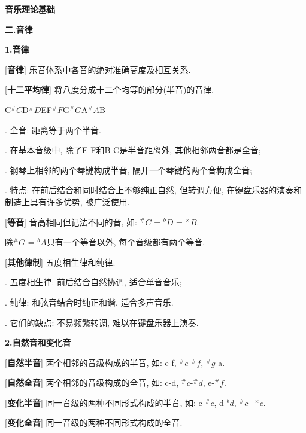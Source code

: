 

\begin{center} 
 \Large \textbf{音乐理论基础}\par
 \textbf{二.音律}
\end{center}

\large 
\begin{center}
 \textbf{1.音律}\\
\end{center}

[\textbf{音律}] 乐音体系中各音的绝对准确高度及相互关系.\par

[\textbf{十二平均律}] 将八度分成十二个均等的部分(半音)的音律.\par
\qquad \quad C\quad $^\#C$\quad D\quad $^\#D$\quad E\quad F\quad $^\#F$\quad G\quad $^\#G$\quad A\quad $^\#A$\quad B\par
{}. 全音: 距离等于两个半音.\par
{}. 在基本音级中, 除了E-F和B-C是半音距离外, 其他相邻两音都是全音;\par
{}. 钢琴上相邻的两个琴键构成半音, 隔开一个琴键的两个音构成全音;\par
{}. 特点: 在前后结合和同时结合上不够纯正自然, 但转调方便, 在键盘乐器的演奏和制造上具有许多优势, 被广泛使用.\par

[\textbf{等音}] 音高相同但记法不同的音, 如: $^\#C$ = $^bD$ = $^\times B$.\par
\qquad 除$^\#G$ = $^bA$只有一个等音以外, 每个音级都有两个等音.\par

[\textbf{其他律制}] 五度相生律和纯律.\par
{}. 五度相生律: 前后结合自然协调, 适合单音音乐;\par
{}. 纯律: 和弦音结合时纯正和谐, 适合多声音乐.\par
{}. 它们的缺点: 不易频繁转调, 难以在键盘乐器上演奏.\par

\begin{center}
 \textbf{2.自然音和变化音}\\
\end{center}

[\textbf{自然半音}] 两个相邻的音级构成的半音, 如: e-f, $^\#e$-$^\#f$, $^\#g$-a.\par

[\textbf{自然全音}] 两个相邻的音级构成的全音, 如: c-d, $^\#c$-$^\#d$, e-$^\#f$.\par

[\textbf{变化半音}] 同一音级的两种不同形式构成的半音, 如: c-$^\#c$, d-$^bd$, $^\#c-^\times c$.\par

[\textbf{变化全音}] 同一音级的两种不同形式构成的全音.\par



